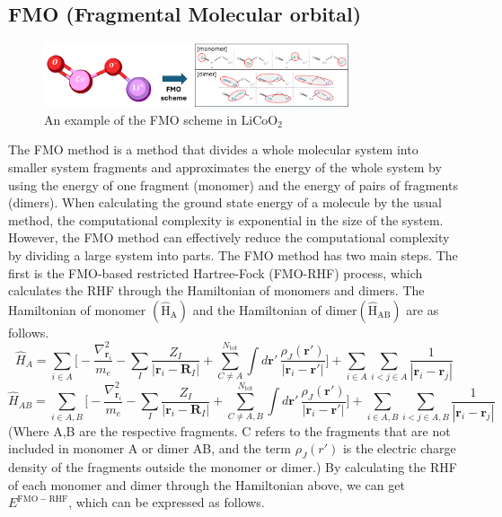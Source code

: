 \documentclass[pdflatex,sn-mathphys-num]{sn-jnl}%
\theoremstyle{thmstyleone}%
\theoremstyle{thmstyletwo}%
\theoremstyle{thmstylethree}%
\begin{document}
\subsection{FMO (Fragmental Molecular orbital)}\label{subsec2.3}
\begin{figure}[H]
\centering
\includegraphics[width=0.8\textwidth]{fig/LiCoO2_FMO.png}
\caption{An example of the FMO scheme in \(\mathrm{LiCoO_2}\)}\label{Fig.4}
\end{figure}
The FMO method is a method that divides a whole molecular system into smaller system fragments and approximates the energy of the whole system by using the energy of one fragment (monomer) and the energy of pairs of fragments (dimers). When calculating the ground state energy of a molecule by the usual method, the computational complexity is exponential in the size of the system. However, the FMO method can effectively reduce the computational complexity by dividing a large system into parts. 
The FMO method has two main steps. The first is the FMO-based restricted Hartree-Fock (FMO-RHF) process, which calculates the RHF through the Hamiltonian of monomers and dimers. The Hamiltonian of monomer \(\mathrm{(\hat{H}_{A})}\) and the Hamiltonian of dimer\(\mathrm{(\hat{H}_{AB})}\) are as follows. 
\begin{equation}
\hat{H}_A = 
\sum_{i \in A} \Bigg[
    -\frac{\nabla_{\mathbf{r}_i}^2}{m_e}
    - \sum_I \frac{Z_I}{|\mathbf{r}_i - \mathbf{R}_I|}
    + \sum_{C \neq A}^{N_{\mathrm{tot}}} 
      \int d\mathbf{r}' \, \frac{\rho_J(\mathbf{r}')}{|\mathbf{r}_i - \mathbf{r}'|}
\Bigg]
+ \sum_{i \in A} \sum_{i<j \in A} \frac{1}{|\mathbf{r}_i - \mathbf{r}_j|}\label{eq5}
\end{equation}
\begin{equation}
\hat{H}_{AB} = 
\sum_{i \in A,B} \Bigg[
    -\frac{\nabla_{\mathbf{r}_i}^2}{m_e}
    - \sum_I \frac{Z_I}{|\mathbf{r}_i - \mathbf{R}_I|}
    + \sum_{C \neq A,B}^{N_{\mathrm{tot}}} 
      \int d\mathbf{r}' \, \frac{\rho_J(\mathbf{r}')}{|\mathbf{r}_i - \mathbf{r}'|}
\Bigg] + \sum_{i \in A,B} \sum_{i<j \in A,B} \frac{1}{|\mathbf{r}_i - \mathbf{r}_j|}
\end{equation}
(Where A,B are the respective fragments. C refers to the fragments that are not included in monomer A or dimer AB, and the term \(\rho_J(r')\) is the electric charge density of the fragments outside the monomer or dimer.) By calculating the RHF of each monomer and dimer through the Hamiltonian above, we can get \({E^\mathrm{FMO-RHF}}\), which can be expressed as follows.
\end{document}
